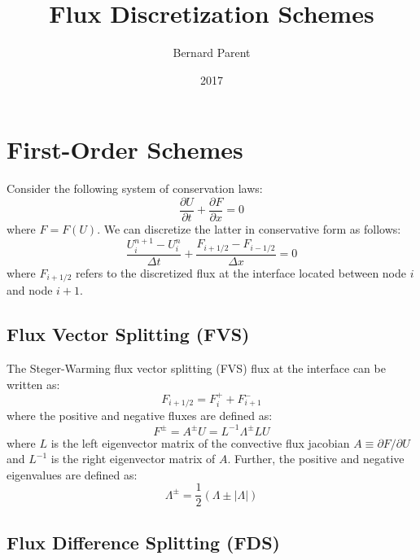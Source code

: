 \documentclass{warpdoc}
\author{
  Bernard Parent
}
\title{
  Flux Discretization Schemes
}
\date{
  2017
}
\begin{document}
  \pagestyle{headings}
  \setcounter{page}{1}
  \makewarpdoctitle
  \tableofcontents


\section{First-Order Schemes}

Consider the following system of conservation laws:
%
\begin{equation}
\frac{\partial U}{\partial t}+ \frac{\partial F}{\partial x}=0
\end{equation}
%
where $F=F(U)$. We can discretize the latter in conservative form as follows:
%
\begin{equation}
\frac{U^{n+1}_i-U^n_i}{\Delta t}+ \frac{F_{i+1/2}-F_{i-1/2}}{\Delta x}=0
\end{equation}
%
where $F_{i+1/2}$ refers to the discretized flux at the interface located between node $i$ and node $i+1$.

\subsection{Flux Vector Splitting (FVS)}

The Steger-Warming flux vector splitting (FVS) \cite{jcp:1981:steger} flux at the interface can be written as:
%
\begin{equation}
F_{i+1/2}=F^+_{i} + F^-_{i+1} 
\end{equation}
%
where the positive and negative fluxes are defined as:
%
\begin{equation}
F^\pm= A^\pm U = L^{-1} \Lambda^\pm L U 
\end{equation}
%
where $L$ is the left eigenvector matrix of the convective flux jacobian $A\equiv\partial F/\partial U$ and $L^{-1}$ is the right eigenvector matrix of $A$.
Further, the positive and negative eigenvalues are defined as:
%
\begin{equation}
\Lambda^\pm = \frac{1}{2}\left( \Lambda \pm |\Lambda|\right)
\end{equation}
%

\subsection{Flux Difference Splitting (FDS)}
\end{document}
